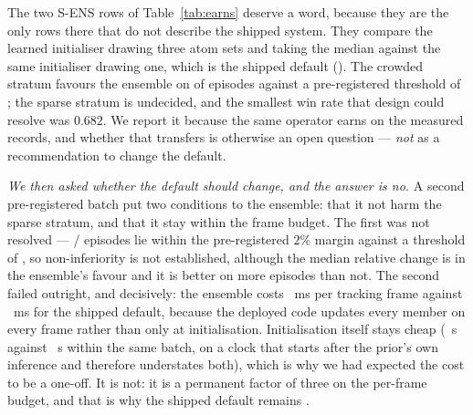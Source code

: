 \documentclass[review]{elsarticle}
\begin{document}
The two S-ENS rows of Table~\ref{tab:earns} deserve a word, because they are the
only rows there that do not describe the shipped system. They compare the learned
initialiser drawing three atom sets and taking the median against the same
initialiser drawing one, which is the shipped default (\DepLearnedEnsK{}). The
crowded stratum favours the ensemble on \SEnsBetter{} of \SEnsN{} episodes against
a pre-registered threshold of \SEnsNominal{}; the sparse stratum is undecided, and
the smallest win rate that design could resolve was $0.682$. We report it because the
same operator earns on the measured records, and whether that transfers is otherwise
an open question --- \emph{not} as a recommendation to change the default.

\emph{We then asked whether the default should change, and the answer is no.} A
second pre-registered batch put two conditions to the ensemble: that it not harm the
sparse stratum, and that it stay within the frame budget. The first was not resolved
--- \TEightK{}/\TEightN{} episodes lie within the pre-registered $2\%$ margin against
a threshold of \TEightThresh{}, so non-inferiority is not established, although the
median relative change is \TEightRel{} in the ensemble's favour and it is better on
more episodes than not. The second failed outright, and decisively: the ensemble
costs \TEightFrameThree{}~ms per tracking frame against \TEightFrameOne{}~ms for the
shipped default, because the deployed code updates every member on every frame rather
than only at initialisation. Initialisation itself stays cheap
(\TEightInitThree{}~s against \TEightInitOne{}~s within the same batch, on a clock
that starts after the prior's own inference and therefore understates both), which is
why we had expected the cost to be a one-off. It is not: it is a permanent factor of
three on the per-frame budget, and that is why the shipped default remains
\DepLearnedEnsK{}.
\end{document}
